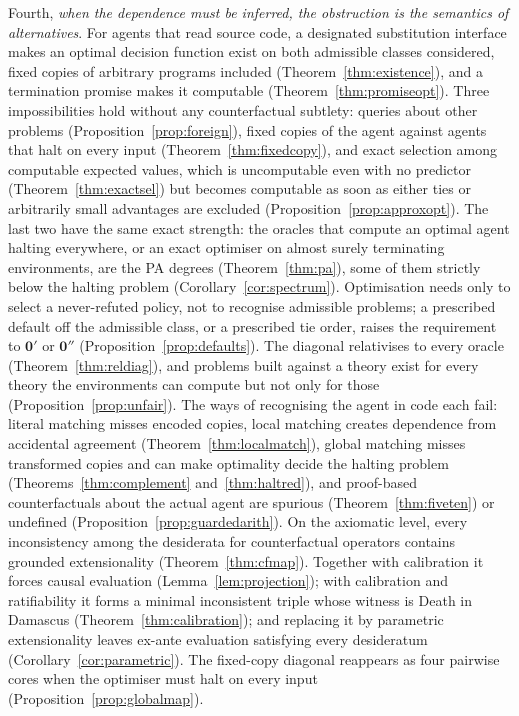 Fourth, \emph{when the dependence must be inferred, the obstruction is the semantics of alternatives}.
For agents that read source code, a designated substitution interface makes an optimal decision
function exist on both admissible classes considered, fixed copies of arbitrary programs included
(Theorem~\ref{thm:existence}), and a termination promise makes it computable
(Theorem~\ref{thm:promiseopt}). Three impossibilities hold without any counterfactual subtlety: queries
about other problems (Proposition~\ref{prop:foreign}), fixed copies of the agent against agents that halt
on every input (Theorem~\ref{thm:fixedcopy}), and exact selection among computable expected values,
which is uncomputable even with no predictor (Theorem~\ref{thm:exactsel}) but becomes computable as soon
as either ties or arbitrarily small advantages are excluded (Proposition~\ref{prop:approxopt}). The last
two have the same exact strength: the oracles that compute an optimal agent halting everywhere, or an
exact optimiser on almost surely terminating environments, are the PA degrees
(Theorem~\ref{thm:pa}), some of them strictly below the halting problem (Corollary~\ref{cor:spectrum}).
Optimisation needs only to select a never-refuted policy, not to recognise admissible problems; a
prescribed default off the admissible class, or a prescribed tie order, raises the requirement to
$\mathbf 0'$ or $\mathbf 0''$ (Proposition~\ref{prop:defaults}). The diagonal relativises to every
oracle (Theorem~\ref{thm:reldiag}), and problems built against a theory exist for every theory the
environments can compute but not only for those (Proposition~\ref{prop:unfair}). The ways of recognising the agent in code
each fail: literal matching misses encoded copies, local matching creates dependence from accidental
agreement (Theorem~\ref{thm:localmatch}), global matching misses transformed copies and can make
optimality decide the halting problem (Theorems~\ref{thm:complement} and~\ref{thm:haltred}), and
proof-based counterfactuals about the actual agent are spurious (Theorem~\ref{thm:fiveten}) or undefined
(Proposition~\ref{prop:guardedarith}). On the axiomatic level, every inconsistency among the desiderata
for counterfactual operators contains grounded extensionality (Theorem~\ref{thm:cfmap}). Together with
calibration it forces causal evaluation (Lemma~\ref{lem:projection}); with calibration and ratifiability
it forms a minimal inconsistent triple whose witness is Death in Damascus
(Theorem~\ref{thm:calibration}); and replacing it by parametric extensionality leaves ex-ante evaluation
satisfying every desideratum (Corollary~\ref{cor:parametric}). The fixed-copy diagonal reappears as
four pairwise cores when the optimiser must halt on every input (Proposition~\ref{prop:globalmap}).

